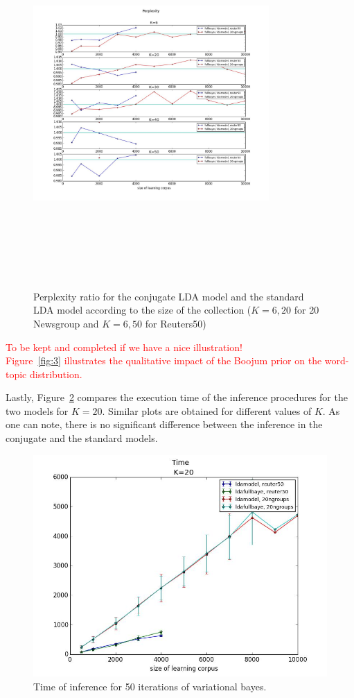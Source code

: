 \begin{figure}[ht]
\label{fig:pp-size}
\includegraphics[width=9cm, height=14cm]{results/pp_D}
\caption{Perplexity ratio for the conjugate LDA model and the standard LDA model according to the size of the collection ($K=6,20$ for 20 Newsgroup and $K=6,50$ for Reuters50)}
\end{figure}


\textcolor{red}{To be kept and completed if we have a nice illustration!\\ Figure~\ref{fig:3} illustrates the qualitative impact of the Boojum prior on the word-topic distribution.}

Lastly, Figure~\ref{fig:time} compares the execution time of the inference procedures for the two models for $K=20$. Similar plots are obtained for different values of $K$. As one can note, there is no significant difference between the inference in the conjugate and the standard models.

\begin{figure}[h]
\label{fig:time}
\includegraphics[scale=0.4]{results/time}
\caption{Time of inference for 50 iterations of variational bayes.}
\end{figure}
